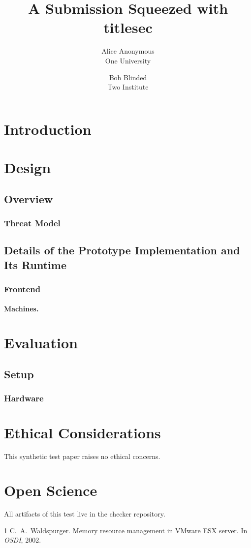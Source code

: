 \documentclass[letterpaper,twocolumn,10pt]{article}
\date{}
\title{\Large \bf A Submission Squeezed with titlesec}
\author{{\rm Alice Anonymous}\\One University \and {\rm Bob Blinded}\\Two Institute}
\begin{document}
\maketitle

\begin{abstract}
\lipsum[1][1-5]
\end{abstract}

\section{Introduction}
\lipsum[2-4]

\section{Design}
\subsection{Overview}
\subsubsection{Threat Model}
\lipsum[5-6]

\subsection{Details of the Prototype Implementation and Its Runtime}
\subsubsection{Frontend}
\paragraph{Machines.}
\lipsum[7]

\section{Evaluation}
\subsection{Setup}
\subsubsection{Hardware}
\lipsum[8-9]

\appendix
\section*{Ethical Considerations}
This synthetic test paper raises no ethical concerns.

\section*{Open Science}
All artifacts of this test live in the checker repository.

\begin{thebibliography}{1}
 C.~A.\ Waldspurger. Memory resource management in VMware ESX
  server. In \emph{OSDI}, 2002.
\end{thebibliography}
\end{document}
